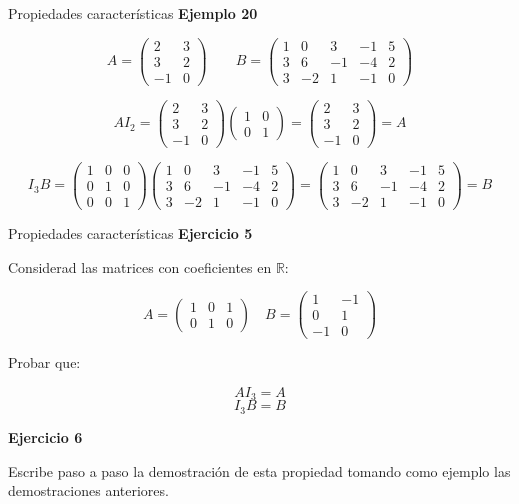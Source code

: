 \documentclass[
  ignorenonframetext,
]{beamer}
\begin{document}
\begin{frame}{Propiedades características}
\protect\hypertarget{propiedades-caracteruxedsticas-13}{}
\textbf{Ejemplo 20}

\[A = \begin{pmatrix}2&3\\3&2\\-1&0\end{pmatrix}\qquad B=\begin{pmatrix}1&0&3&-1&5\\3&6&-1&-4&2\\3&-2&1&-1&0\end{pmatrix}\]

\[AI_2 = \begin{pmatrix}2&3\\3&2\\-1&0\end{pmatrix}\begin{pmatrix}1&0\\0&1\end{pmatrix} = \begin{pmatrix}2&3\\3&2\\-1&0\end{pmatrix} = A\]

\[I_3B = \begin{pmatrix}1&0&0\\0&1&0\\0&0&1\end{pmatrix}\begin{pmatrix}1&0&3&-1&5\\3&6&-1&-4&2\\3&-2&1&-1&0\end{pmatrix}=\begin{pmatrix}1&0&3&-1&5\\3&6&-1&-4&2\\3&-2&1&-1&0\end{pmatrix}=B\]
\end{frame}

\begin{frame}{Propiedades características}
\protect\hypertarget{propiedades-caracteruxedsticas-14}{}
\textbf{Ejercicio 5}

Considerad las matrices con coeficientes en \(\mathbb{R}\):

\[A=\begin{pmatrix}1&0&1\\0&1&0\end{pmatrix}\quad B = \begin{pmatrix}1&-1\\0&1\\-1&0\end{pmatrix}\]

Probar que:

\[AI_3 = A\] \[I_3B=B\]

\textbf{Ejercicio 6}

Escribe paso a paso la demostración de esta propiedad tomando como
ejemplo las demostraciones anteriores.
\end{frame}
\end{document}
